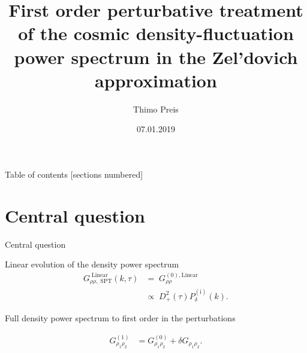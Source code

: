 \documentclass[10pt]{beamer}
\title{First order perturbative treatment of the cosmic density-fluctuation power spectrum in the Zel’dovich approximation}
\date{07.01.2019}
\author{Thimo Preis}
\begin{document}
	
	\maketitle
	
	\begin{frame}{Table of contents}
	[sections numbered]
	\tableofcontents[hideallsubsections]
\end{frame}
\section{Central question}

\begin{frame}{Central question}
\begin{block}{Linear evolution of the density power spectrum}
	\begin{align}
	G^{\;\textrm{Linear}}_{\rho \rho,\;\mathrm{SPT}}(k, \tau) &= \; G^{(0), \textrm{Linear}}_{\rho \rho}\\[7pt]
	&\propto \;D^2_+ (\tau) P^{(\mathrm{i})}_{\delta}(k)\nonumber.
	\end{align} 
\end{block}
      \begin{block}{Full density power spectrum to first order in the perturbations}

	\begin{align}\label{eq:Goal}
	G^{(1)}_{\rho_1 \rho_2}& = G^{(0)}_{\rho_1 \rho_2} + \delta G_{\rho_1 \rho_2}.
	\end{align}
\end{block}

\end{frame}
\end{document}
